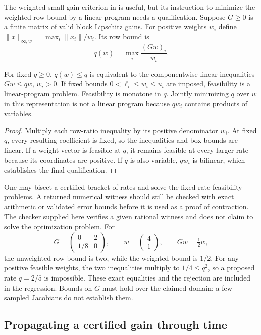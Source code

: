 The weighted small-gain criterion in \citet{ToricAuditQuivers2026} is
useful, but its instruction to minimize the weighted row bound by a
linear program needs a qualification. Suppose $G\ge0$ is a finite
matrix of valid block Lipschitz gains. For positive weights $w_i$ define
$\|x\|_{\infty,w}=\max_i\|x_i\|/w_i$. Its row bound is
\[
 q(w)=\max_i \frac{(Gw)_i}{w_i}.
\]

\begin{proposition}
\label{prop:weighted-gain-feasibility}
For fixed $q\ge0$, $q(w)\le q$ is equivalent to the componentwise
linear inequalities $Gw\le qw$, $w_i>0$. If fixed bounds
$0<\ell_i\le w_i\le u_i$ are imposed, feasibility is a linear-program
problem. Feasibility is monotone in $q$. Jointly minimizing $q$ over
$w$ in this representation is not a linear program because $qw_i$
contains products of variables.
\end{proposition}
\begin{proof}
Multiply each row-ratio inequality by its positive denominator $w_i$.
At fixed $q$, every resulting coefficient is fixed, so the inequalities
and box bounds are linear. If a weight vector is feasible at $q$, it
remains feasible at every larger rate because its coordinates are
positive. If $q$ is also variable, $qw_i$ is bilinear, which establishes
the final qualification.
\end{proof}

One may bisect a certified bracket of rates and solve the fixed-rate
feasibility problems. A returned numerical witness should still be
checked with exact arithmetic or validated error bounds before it is used
as a proof of contraction. The checker supplied here verifies a given
rational witness and does not claim to solve the optimization problem.
For
\[
 G=\begin{pmatrix}0&2\\1/8&0\end{pmatrix},\qquad
 w=\begin{pmatrix}4\\1\end{pmatrix},
 \qquad Gw=\tfrac12w,
\]
the unweighted row bound is two, while the weighted bound is $1/2$.
For any positive feasible weights, the two inequalities multiply to
$1/4\le q^2$, so a proposed rate $q=2/5$ is impossible. These exact
equalities and the rejection are included in the regression. Bounds on
$G$ must hold over the claimed domain; a few sampled Jacobians do not
establish them.

\subsection{Propagating a certified gain through time}

